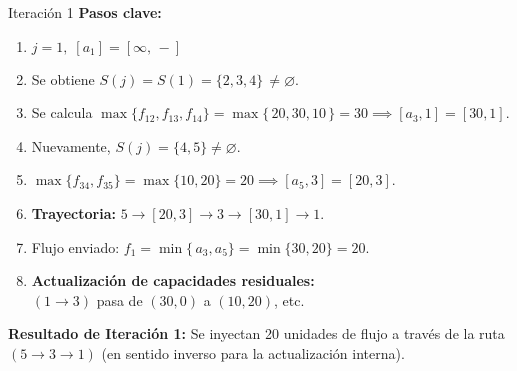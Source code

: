 \documentclass{beamer}
\begin{document}
\begin{frame}{Iteración 1}
\small
\textbf{Pasos clave:}
\begin{enumerate}
    \item \(\displaystyle j=1,\; [a_1] = [\infty,\,-]\)
    \item Se obtiene \(S(j) = S(1) = \{2,3,4\}\,\neq \varnothing\). 
    \item Se calcula \(\max\{f_{12}, f_{13}, f_{14}\} = \max\{\,20, 30, 10\,\} = 30 \implies [a_{3},1] = [30,1]\).
    \item Nuevamente, \(S(j) = \{4,5\} \neq \varnothing\).
    \item \(\max\{f_{34}, f_{35}\} = \max\{10, 20\}=20 \implies [a_{5},3] = [20,3]\).
    \item \textbf{Trayectoria:} \(5 \to [20,3] \to 3 \to [30,1] \to 1\).
    \item Flujo enviado: \(f_1 = \min\{\,a_{3}, a_{5}\} = \min\{30,20\} = 20\).
    \item \textbf{Actualización de capacidades residuales:}\\
          \((1\to 3)\) pasa de \((30,0)\) a \((10,20)\), etc.
\end{enumerate}

\textbf{Resultado de Iteración 1:} Se inyectan 20 unidades de flujo a través de la ruta \((5\rightarrow 3\rightarrow 1)\) (en sentido inverso para la actualización interna).
\end{frame}
\end{document}
